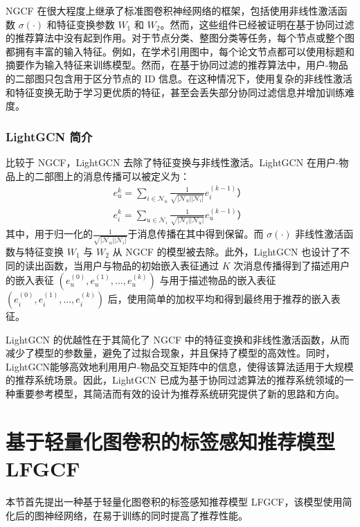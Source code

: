 NGCF 在很大程度上继承了标准图卷积神经网络的框架，包括使用非线性激活函数 $\sigma(\cdot)$ 和特征变换参数 $W_1$ 和 $W_2$。然而，这些组件已经被证明在基于协同过滤的推荐算法中没有起到作用\cite{he_lightgcn_2020}。对于节点分类、整图分类等任务，每个节点或整个图都拥有丰富的输入特征。例如，在学术引用图中，每个论文节点都可以使用标题和摘要作为输入特征来训练模型\cite{hu_ogb-lsc_2021}。然而，在基于协同过滤的推荐算法中，用户-物品的二部图只包含用于区分节点的 ID 信息。在这种情况下，使用复杂的非线性激活和特征变换无助于学习更优质的特征，甚至会丢失部分协同过滤信息并增加训练难度。

\subsubsection{LightGCN 简介}
比较于 NGCF，LightGCN 去除了特征变换与非线性激活。LightGCN 在用户-物品上的二部图上的消息传播可以被定义为：
\begin{equation}
    \begin{aligned}
        e_u^{k} = \sum_{i\in\mathcal{N}_u} \frac{1}{\sqrt{|\mathcal{N}_u||\mathcal{N}_i|}}e_i^{(k-1)}）\\
        e_i^{k} = \sum_{u\in\mathcal{N}_i} \frac{1}{\sqrt{|\mathcal{N}_i||\mathcal{N}_u|}}e_u^{(k-1)}）
    \end{aligned}
\end{equation}
其中，用于归一化的$\frac{1}{\sqrt{|\mathcal{N}_u||\mathcal{N}_i|}}$于消息传播在其中得到保留。而 $\sigma(\cdot)$ 非线性激活函数与特征变换 $W_1$ 与 $W_2$ 从 NGCF 的模型被去除。此外，LightGCN 也设计了不同的读出函数，当用户与物品的初始嵌入表征通过 $K$ 次消息传播得到了描述用户的嵌入表征 $(e_u^{(0)},e_u^{(1)},\dots,e_u^{(k)})$ 与用于描述物品的嵌入表征 $(e_i^{(0)},e_i^{(1)},\dots,e_i^{(k)})$ 后，使用简单的加权平均和得到最终用于推荐的嵌入表征。

LightGCN 的优越性在于其简化了 NGCF 中的特征变换和非线性激活函数，从而减少了模型的参数量，避免了过拟合现象，并且保持了模型的高效性。同时，LightGCN能够高效地利用用户-物品交互矩阵中的信息，使得该算法适用于大规模的推荐系统场景。因此，LightGCN 已成为基于协同过滤算法的推荐系统领域的一种重要参考模型，其简洁而有效的设计为推荐系统研究提供了新的思路和方向。

\section{基于轻量化图卷积的标签感知推荐模型 LFGCF}
本节首先提出一种基于轻量化图卷积的标签感知推荐模型 LFGCF，该模型使用简化后的图神经网络，在易于训练的同时提高了推荐性能。
